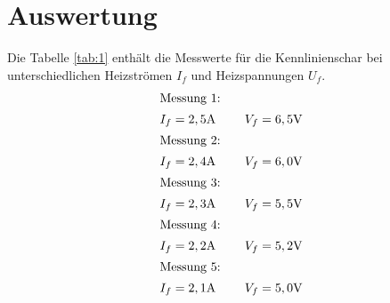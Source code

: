 \section{Auswertung}
\label{sec:Auswertung}
Die Tabelle \ref{tab:1} enthält die Messwerte für die Kennlinienschar
bei unterschiedlichen Heizströmen $I_{f}$ und Heizspannungen $U_f$.
\begin{align*}
\intertext{Messung 1:}  I_f&=2,5\si{\ampere} \ \ \ \ &V_f=6,5\si{\volt}\\
\intertext{Messung 2:}  I_f&=2,4\si{\ampere} \ \ \ \ &V_f=6,0\si{\volt}\\
\intertext{Messung 3:}  I_f&=2,3\si{\ampere} \ \ \ \ &V_f=5,5\si{\volt}\\
\intertext{Messung 4:}  I_f&=2,2\si{\ampere} \ \ \ \ &V_f=5,2\si{\volt}\\
\intertext{Messung 5:}  I_f&=2,1\si{\ampere} \ \ \ \ &V_f=5,0\si{\volt}
\end{align*}



